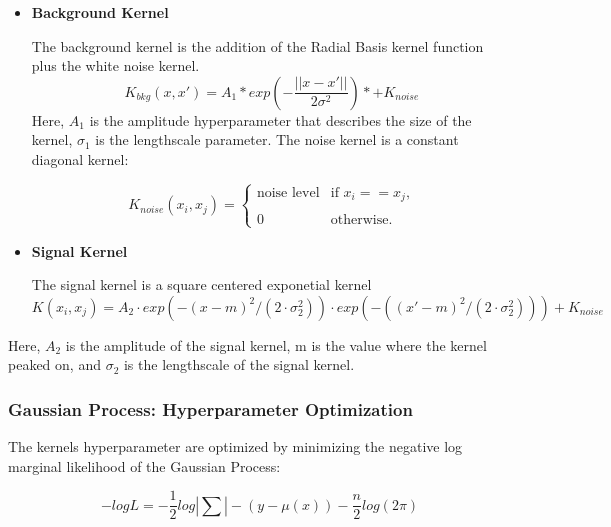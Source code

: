     \begin{itemize}
        \item \textbf{Background Kernel}

            The background kernel is the addition of the Radial Basis kernel function plus the white noise kernel.
            \begin{equation}
                K_{bkg}(x, x') = A_{1} * exp(-\frac{||x-x'||}{2\sigma^{2}}) *+ K_{noise}
            \end{equation}
            Here, $A_{1}$ is the amplitude hyperparameter that describes the size of the kernel, $\sigma_{1}$ is the lengthscale parameter.
            The noise kernel is a constant diagonal kernel:
            

			\begin{equation}
            K_{noise}(x_{i}, x_{j}) =
			\begin{cases} \text{noise level} & \text{if $x_{i}==x_{j}$,} \\
			\\
            0 & \text{otherwise.}
			\end{cases}
			\end{equation}

        \item \textbf{Signal Kernel}

            The signal kernel is a square centered exponetial kernel
            \begin{equation}
            K(x_{i}, x_{j})=A_{2}\cdot exp(-(x-m)^{2}/(2\cdot\sigma_{2}^{2}))\cdot exp(-((x'-m)^{2}/(2\cdot\sigma_{2}^{2}))) + K_{noise}
            \end{equation}

    \end{itemize}
            Here, $A_{2}$ is the amplitude of the signal kernel, m is the value where the kernel peaked on, and $\sigma_{2}$ is the lengthscale of the signal kernel. 
    \subsubsection{Gaussian Process: Hyperparameter Optimization}
    The kernels hyperparameter are optimized by minimizing the negative log marginal likelihood of the Gaussian Process:

    \begin{equation}
        -logL = -\frac{1}{2} log |\sum| - (y-\mu(x) ) - \frac{n}{2}log(2\pi)
    \label{eq:loglikelihood}
    \end{equation}
    
